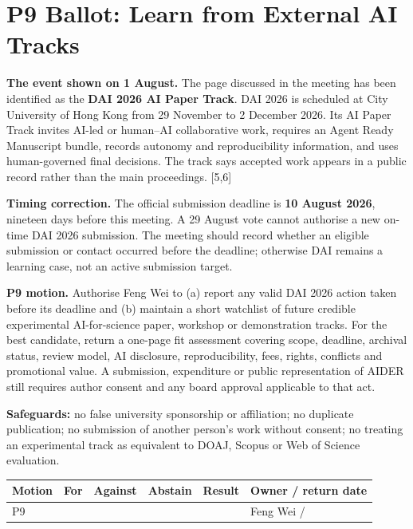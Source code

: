 \documentclass[11pt]{article}
\newcommand{\src}[1]{{\footnotesize\color{ink3}[#1]}}
\begin{document}
\section{P9 Ballot: Learn from External AI Tracks}

\textbf{The event shown on 1 August.} The page discussed in the meeting has been identified as the \textbf{DAI 2026 AI Paper Track}. DAI 2026 is scheduled at City University of Hong Kong from 29 November to 2 December 2026. Its AI Paper Track invites AI-led or human--AI collaborative work, requires an Agent Ready Manuscript bundle, records autonomy and reproducibility information, and uses human-governed final decisions. The track says accepted work appears in a public record rather than the main proceedings. \src{5,6}

\begin{warnbox}
\textbf{Timing correction.} The official submission deadline is \textbf{10 August 2026}, nineteen days before this meeting. A 29 August vote cannot authorise a new on-time DAI 2026 submission. The meeting should record whether an eligible submission or contact occurred before the deadline; otherwise DAI remains a learning case, not an active submission target.
\end{warnbox}

\begin{solvebox}
\textbf{P9 motion.} Authorise Feng Wei to (a) report any valid DAI 2026 action taken before its deadline and (b) maintain a short watchlist of future credible experimental AI-for-science paper, workshop or demonstration tracks. For the best candidate, return a one-page fit assessment covering scope, deadline, archival status, review model, AI disclosure, reproducibility, fees, rights, conflicts and promotional value. A submission, expenditure or public representation of AIDER still requires author consent and any board approval applicable to that act.
\end{solvebox}

\textbf{Safeguards:} no false university sponsorship or affiliation; no duplicate publication; no submission of another person's work without consent; no treating an experimental track as equivalent to DOAJ, Scopus or Web of Science evaluation.

\begin{center}\small\sffamily
\begin{tabular}{@{}p{1.2cm}p{2cm}p{2cm}p{2cm}p{2cm}p{3.2cm}@{}}
\toprule
\textbf{Motion} & \textbf{For} & \textbf{Against} & \textbf{Abstain} & \textbf{Result} & \textbf{Owner / return date} \\
\midrule
P9 & & & & & Feng Wei / \\[9pt]
\bottomrule
\end{tabular}
\end{center}
\end{document}
